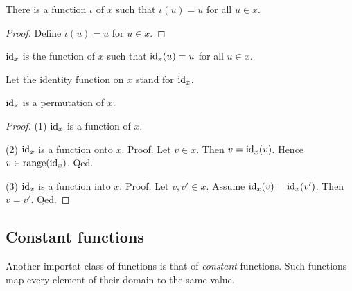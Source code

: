 \documentclass[../../set-theory.tex]{subfiles}
\begin{document}
  \begin{forthel}
    \begin{lemma}
      There is a function $\iota$ of $x$ such that $\iota(u) = u$ for all $u \in x$.
    \end{lemma}
    \begin{proof}
      Define $\iota(u) = u$ for $u \in x$.
    \end{proof}

    \begin{definition}
      $\operatorname{id}_{x}$ is the function of $x$ such that $\operatorname{id}_{x}(u) = u$ for all $u \in x$.
    \end{definition}

    Let the identity function on $x$ stand for $\operatorname{id}_{x}$.

    \begin{proposition}\label{SetTheory_02_01_848243}
      $\operatorname{id}_{x}$ is a permutation of $x$.
    \end{proposition}
    \begin{proof}
      (1) $\operatorname{id}_{x}$ is a function of $x$.

      (2) $\operatorname{id}_{x}$ is a function onto $x$.
      Proof.
        Let $v \in x$.
        Then $v = \operatorname{id}_{x}(v)$.
        Hence $v \in \operatorname{range}(\operatorname{id}_{x})$.
      Qed.

      (3) $\operatorname{id}_{x}$ is a function into $x$.
      Proof.
        Let $v,v' \in x$.
        Assume $\operatorname{id}_{x}(v) = \operatorname{id}_{x}(v')$.
        Then $v = v'$.
      Qed.
    \end{proof}
  \end{forthel}


  \subsection{Constant functions}

  Another importat class of functions is that of \textit{constant} functions.
  Such functions map every element of their domain to the same value.
\end{document}
